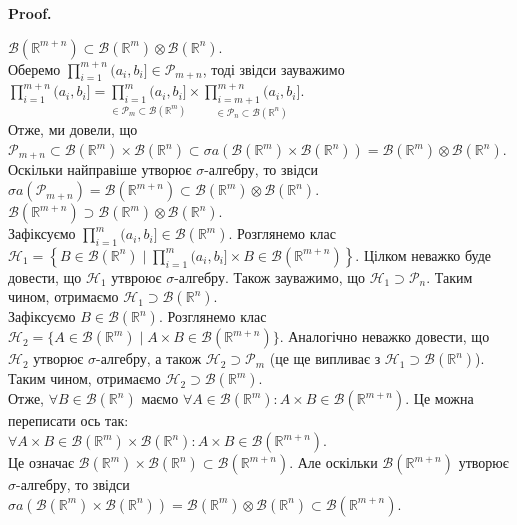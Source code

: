 \documentclass[a4paper, 10pt]{article}
\makeatletter
\theoremstyle{theoremdd}
\renewenvironment{proof}[1][Proof.\\]{\par
\pushQED{\hfill \qed}%
\normalfont \topsep6\p@\@plus6\p@\relax
\trivlist
\item\relax
{\bfseries
#1\@addpunct{.}}\hspace\labelsep\ignorespaces
}{%
\popQED\endtrivlist\@endpefalse
}
\makeatother
\begin{document}
\begin{proof}
$\mathcal{B}(\mathbb{R}^{m+n}) \subset \mathcal{B}(\mathbb{R}^m) \otimes \mathcal{B}(\mathbb{R}^n)$.\\
Оберемо $\displaystyle\prod_{i=1}^{m+n} (a_i,b_i] \in \mathcal{P}_{m+n}$, тоді звідси зауважимо $\displaystyle\prod_{i=1}^{m+n} (a_i,b_i] = \underset{\in \mathcal{P}_m \subset \mathcal{B}(\mathbb{R}^m)}{\prod_{i=1}^m (a_i,b_i]} \times \underset{\in \mathcal{P}_n \subset \mathcal{B}(\mathbb{R}^n)}{\prod_{i=m+1}^{m+n} (a_i,b_i]}$.\\
Отже, ми довели, що $\mathcal{P}_{m+n} \subset \mathcal{B}(\mathbb{R}^m) \times \mathcal{B}(\mathbb{R}^n) \subset \sigma a(\mathcal{B}(\mathbb{R}^m) \times \mathcal{B}(\mathbb{R}^n)) = \mathcal{B}(\mathbb{R}^m) \otimes \mathcal{B}(\mathbb{R}^n)$.\\
Оскільки найправіше утворює $\sigma$-алгебру, то звідси $\sigma a(\mathcal{P}_{m+n}) = \mathcal{B}(\mathbb{R}^{m+n}) \subset \mathcal{B}(\mathbb{R}^m) \otimes \mathcal{B}(\mathbb{R}^n)$.
\bigskip \\
$\mathcal{B}(\mathbb{R}^{m+n}) \supset \mathcal{B}(\mathbb{R}^m) \otimes \mathcal{B}(\mathbb{R}^n)$.\\
Зафіксуємо $\displaystyle\prod_{i=1}^m (a_i,b_i] \in \mathcal{B}(\mathbb{R}^m)$. Розглянемо клас $\displaystyle\mathcal{H}_1 = \left\{ B \in \mathcal{B}(\mathbb{R}^n) \mid \prod_{i=1}^m (a_i,b_i] \times B \in \mathcal{B}(\mathbb{R}^{m+n})\right\}$. Цілком неважко буде довести, що $\mathcal{H}_1$ утвроює $\sigma$-алгебру. Також зауважимо, що $\mathcal{H}_1 \supset \mathcal{P}_n$. Таким чином, отримаємо $\mathcal{H}_1 \supset \mathcal{B}(\mathbb{R}^n)$.\\
Зафіксуємо $B \in \mathcal{B}(\mathbb{R}^n)$. Розглянемо клас $\mathcal{H}_2 = \{A \in \mathcal{B}(\mathbb{R}^m) \mid A \times B \in \mathcal{B}(\mathbb{R}^{m+n})\}$. Аналогічно неважко довести, що $\mathcal{H}_2$ утворює $\sigma$-алгебру, а також $\mathcal{H}_2 \supset \mathcal{P}_m$ (це ще випливає з $\mathcal{H}_1 \supset \mathcal{B}(\mathbb{R}^n)$). Таким чином, отримаємо $\mathcal{H}_2 \supset \mathcal{B}(\mathbb{R}^m)$.\\
Отже, $\forall B \in \mathcal{B}(\mathbb{R}^n)$ маємо $\forall A \in \mathcal{B}(\mathbb{R}^m): A \times B \in \mathcal{B}(\mathbb{R}^{m+n})$. Це можна переписати ось так:\\
$\forall A \times B \in \mathcal{B}(\mathbb{R}^m) \times \mathcal{B}(\mathbb{R}^n): A \times B \in \mathcal{B}(\mathbb{R}^{m+n})$.\\
Це означає $\mathcal{B}(\mathbb{R}^m) \times \mathcal{B}(\mathbb{R}^n) \subset \mathcal{B}(\mathbb{R}^{m+n})$. Але оскільки $\mathcal{B}(\mathbb{R}^{m+n})$ утворює $\sigma$-алгебру, то звідси \\ $\sigma a (\mathcal{B}(\mathbb{R}^m) \times \mathcal{B}(\mathbb{R}^n)) = \mathcal{B}(\mathbb{R}^m) \otimes \mathcal{B}(\mathbb{R}^n) \subset \mathcal{B}(\mathbb{R}^{m+n})$.
\end{proof}
\end{document}
